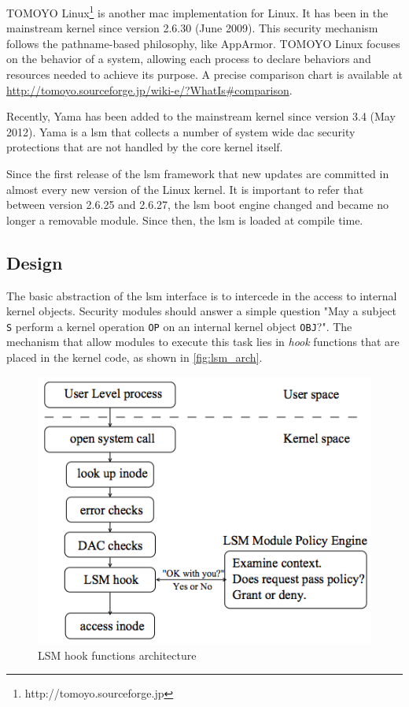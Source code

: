 TOMOYO Linux\footnote{http://tomoyo.sourceforge.jp} is another \gls{mac} implementation for Linux. It has been in the mainstream kernel since version 2.6.30 (June 2009). This security mechanism follows the pathname-based philosophy, like AppArmor. TOMOYO Linux focuses on the behavior of a system, allowing each process to declare behaviors and resources needed to achieve its purpose. A precise comparison chart is available at \url{http://tomoyo.sourceforge.jp/wiki-e/?WhatIs#comparison}.

Recently, Yama has been added to the mainstream kernel since version 3.4 (May 2012). Yama is a \gls{lsm} that collects a number of system wide \gls{dac} security protections that are not handled by the core kernel itself.

Since the first release of the \gls{lsm} framework that new updates are committed in almost every new version of the Linux kernel. It is important to refer that between version 2.6.25 and 2.6.27, the \gls{lsm} boot engine changed and became no longer a removable module. Since then, the \gls{lsm} is loaded at compile time.

\subsection{Design}

The basic abstraction of the \gls{lsm} interface is to intercede in the access to internal kernel objects. Security modules should answer a simple question "May a subject \texttt{S} perform a kernel operation \texttt{OP} on an internal kernel object \texttt{OBJ}?". The mechanism that allow modules to execute this task lies in \textit{hook} functions that are placed in the kernel code, as shown in \autoref{fig:lsm_arch}.

\begin{figure}[h]
 \centering
 \includegraphics[scale=0.5]{figures/LSM_architecture.png}
 \caption{LSM hook functions architecture}
 \label{fig:lsm_arch}
\end{figure}

